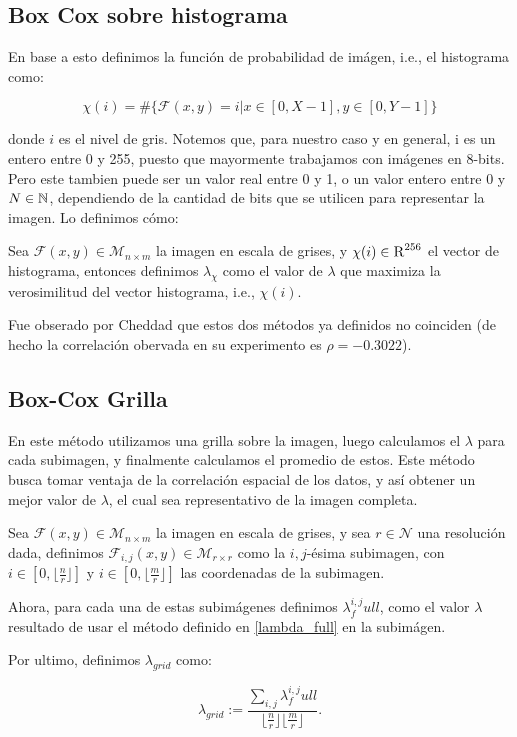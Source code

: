     \subsection{Box Cox sobre histograma}

    En base a esto definimos la funci\'on de probabilidad de im\'agen, i.e., el histograma como:
    
    $$\chi(i)= \# \{\mathcal{F}(x,y)=i | x\in[0,X-1], y\in[0,Y-1] \}$$ 

    donde $i$ es el nivel de gris. Notemos que, para nuestro caso y en general, i es un entero entre 0 y 255, puesto que mayormente trabajamos con im\'agenes en 8-bits. Pero este tambien puede ser un valor real entre 0 y 1, o un valor entero entre 0 y $N\in\mathbb{N}$, dependiendo de la cantidad de bits que se utilicen para representar la imagen. Lo definimos cómo:

    \begin{defn}\label{lambda_hist}
        Sea $\mathcal{F}(x, y)\in\mathcal{M}_{n\times m}$ la imagen en escala de grises, y $\chi(i)\in\textsc{R}^{256}$ el vector de histograma, entonces definimos $\lambda_{\chi}$ como el valor de $\lambda$ que maximiza la verosimilitud del vector histograma, i.e., $\chi(i)$.
    \end{defn}
    
    Fue obserado por Cheddad que estos dos m\'etodos ya definidos no coinciden (de hecho la correlaci\'on obervada en su experimento es $\rho=-0.3022$).

    \subsection{Box-Cox Grilla}

    En este m\'etodo utilizamos una grilla sobre la imagen, luego calculamos el $\lambda$ para cada subimagen, y finalmente calculamos el promedio de estos. Este m\'etodo busca tomar ventaja de la correlaci\'on espacial de los datos, y as\'i obtener un mejor valor de $\lambda$, el cual sea representativo de la imagen completa.

    
    \begin{defn}\label{lambda_grid}
        Sea $\mathcal{F}(x, y)\in\mathcal{M}_{n\times m}$ la imagen en escala de grises, y sea $r \in \mathcal{N} $ una resoluci\'on dada, definimos $\mathcal{F}_{i,j}(x, y)\in\mathcal{M}_{r\times r}$ como la $i,j$-ésima subimagen, con $i\in[0,\lfloor\frac{n}{r}\rfloor]$ y $i\in[0,\lfloor\frac{m}{r}\rfloor]$ las coordenadas de la subimagen.
        
        Ahora, para cada una de estas subim\'agenes definimos $\lambda^{i,j}_full$, como el valor $\lambda$ resultado de usar el m\'etodo definido en \ref{lambda_full} en la subim\'agen.

        Por ultimo, definimos $\lambda_{grid}$ como:
        
        $$
        \lambda_{grid} := \frac{\sum_{i,j} \lambda^{i,j}_full}{\lfloor\frac{n}{r}\rfloor\lfloor\frac{m}{r}\rfloor}.
        $$
    \end{defn}
    
